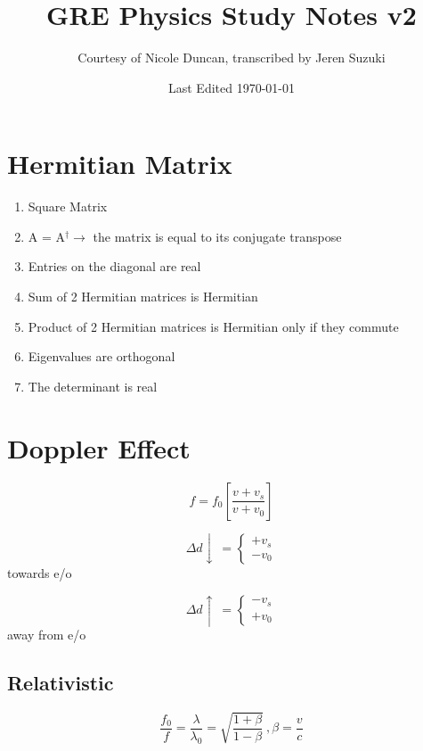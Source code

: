 \documentclass[10pt,a4paper]{article}
\title{GRE Physics Study Notes v2}
\author{Courtesy of Nicole Duncan, transcribed by Jeren Suzuki}
\date{Last Edited \today}
\begin{document}
\maketitle
{}
\newpage
\tableofcontents
\newpage
{}


\section{Hermitian Matrix} %
\label{sec:hermitian_matrix}
\begin{enumerate}
    \item Square Matrix
    \item A = A$^\dagger \rightarrow$ the matrix is equal to its conjugate transpose
    \item Entries on the diagonal are real
    \item Sum of 2 Hermitian matrices is Hermitian
    \item Product of 2 Hermitian matrices is Hermitian only if they commute
    \item Eigenvalues are orthogonal
    \item The determinant is real
\end{enumerate}

\section{Doppler Effect} %
\label{sec:doppler_effect}
\begin{equation}
    f = f_0 \left[  \frac{v + v_s}{v + v_0}\right]
\end{equation}

\[
 \Delta d \downarrow ~=
  \begin{cases}
   + v_s \\
   - v_0
  \end{cases}
\] towards e/o

\[
 \Delta d \uparrow ~=
  \begin{cases}
   - v_s \\
   + v_0
  \end{cases}
\] away from e/o

\subsection{Relativistic} %
\label{sub:relativistic}
\begin{equation}
    \frac{f_0}{f} = \frac{\lambda}{\lambda_0} = \sqrt{\frac{1 + \beta}{1 - \beta}}~, \beta = \frac{v}{c}
\end{equation}
\end{document}
